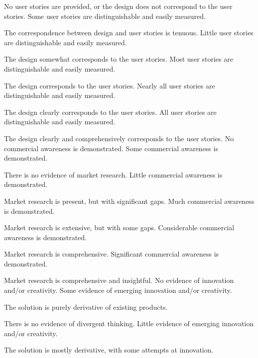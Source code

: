 \documentclass{../fal_assignment}
\begin{document}
\begin{markingrubric}
        \grade\fail No user stories are provided, or the design does not correspond to the user stories.
        \grade Some user stories are distinguishable and easily measured.
            \par The correspondence between design and user stories is tenuous.
        \grade Little user stories are distinguishable and easily measured.
            \par The design somewhat corresponds to the user stories.
        \grade Most user stories are distinguishable and easily measured.
            \par The design corresponds to the user stories.
        \grade Nearly all user stories are distinguishable and easily measured.
            \par The design clearly corresponds to the user stories.
        \grade All user stories are distinguishable and easily measured.
            \par The design clearly and comprehensively corresponds to the user stories.
%
        \grade\fail No commercial awareness is demonstrated.
        \grade Some commercial awareness is demonstrated.
            \par There is no evidence of market research.
        \grade Little commercial awareness is demonstrated.
            \par Market research is present, but with significant gaps.
        \grade Much commercial awareness is demonstrated.
            \par Market research is extensive, but with some gaps.
        \grade Considerable commercial awareness is demonstrated.
            \par Market research is comprehensive.
        \grade Significant commercial awareness is demonstrated.
            \par Market research is comprehensive and insightful.
%
        \grade\fail No evidence of innovation and/or creativity.
        \grade Some evidence of emerging innovation and/or creativity.
            \par The solution is purely derivative of existing products.
            \par There is no evidence of divergent thinking.
        \grade Little evidence of emerging innovation and/or creativity.
            \par The solution is mostly derivative, with some attempts at innovation.

\end{markingrubric}
\end{document}
